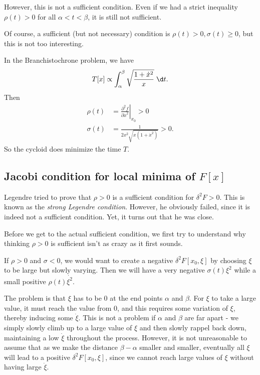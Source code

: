 \documentclass[a4paper]{article}
\begin{document}
However, this is not a sufficient condition. Even if we had a strict inequality $\rho (t) > 0$ for all $\alpha < t < \beta$, it is still not sufficient.

Of course, a sufficient (but not necessary) condition is $\rho(t) > 0, \sigma(t) \geq 0$, but this is not too interesting.

\begin{eg}
  In the Branchistochrone problem, we have
  \[
    T[x] \propto \int_\alpha^\beta \sqrt{\frac{1 + \dot{x}^2}{x}}\;\d t.
  \]
  Then
  \begin{align*}
    \rho(t) &= \left.\frac{\partial^2 f}{\partial \dot{x}^2}\right|_{x_0} > 0\\
    \sigma(t) &= \frac{1}{2x^2\sqrt{x(1 + \dot{x}^2)}} > 0.
  \end{align*}
  So the cycloid does minimize the time $T$.
\end{eg}
\subsection{Jacobi condition for local minima of \texorpdfstring{$F[x]$}{F[x]}}
Legendre tried to prove that $\rho > 0$ is a sufficient condition for $\delta^2 F > 0$. This is known as the \emph{strong Legendre condition}. However, he obviously failed, since it is indeed not a sufficient condition. Yet, it turns out that he was close.

Before we get to the actual sufficient condition, we first try to understand why thinking $\rho > 0$ is sufficient isn't as crazy as it first sounds.

If $\rho > 0$ and $\sigma < 0$, we would want to create a negative $\delta^2 F[x_0, \xi]$ by choosing $\xi$ to be large but slowly varying. Then we will have a very negative $\sigma(t)\xi^2$ while a small positive $\rho(t) \dot{\xi^2}$.

The problem is that $\xi$ has to be $0$ at the end points $\alpha$ and $\beta$. For $\xi$ to take a large value, it must reach the value from $0$, and this requires some variation of $\xi$, thereby inducing some $\dot{\xi}$. This is not a problem if $\alpha$ and $\beta$ are far apart - we simply slowly climb up to a large value of $\xi$ and then slowly rappel back down, maintaining a low $\dot{\xi}$ throughout the process. However, it is not unreasonable to assume that as we make the distance $\beta - \alpha$ smaller and smaller, eventually all $\xi$ will lead to a positive $\delta^2 F[x_0, \xi]$, since we cannot reach large values of $\xi$ without having large $\dot{\xi}$.
\end{document}
